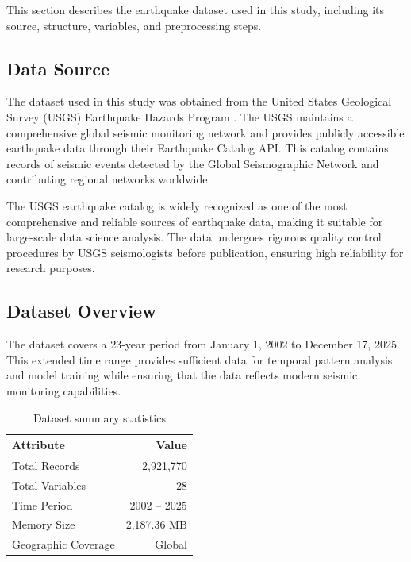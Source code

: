
This section describes the earthquake dataset used in this study, including its source, structure, variables, and preprocessing steps.

\subsection{Data Source}

The dataset used in this study was obtained from the United States Geological Survey (USGS) Earthquake Hazards Program \cite{usgs2024}. The USGS maintains a comprehensive global seismic monitoring network and provides publicly accessible earthquake data through their Earthquake Catalog API. This catalog contains records of seismic events detected by the Global Seismographic Network and contributing regional networks worldwide.

The USGS earthquake catalog is widely recognized as one of the most comprehensive and reliable sources of earthquake data, making it suitable for large-scale data science analysis. The data undergoes rigorous quality control procedures by USGS seismologists before publication, ensuring high reliability for research purposes.

\subsection{Dataset Overview}

The dataset covers a 23-year period from January 1, 2002 to December 17, 2025. This extended time range provides sufficient data for temporal pattern analysis and model training while ensuring that the data reflects modern seismic monitoring capabilities.

\begin{table}[H]
\centering
\caption{Dataset summary statistics}
\begin{tabular}{|l|r|}
\hline
\textbf{Attribute} & \textbf{Value} \\
\hline
Total Records & 2,921,770 \\
Total Variables & 28 \\
Time Period & 2002 -- 2025 \\
Memory Size & 2,187.36 MB \\
Geographic Coverage & Global \\
\hline
\end{tabular}
\end{table}

